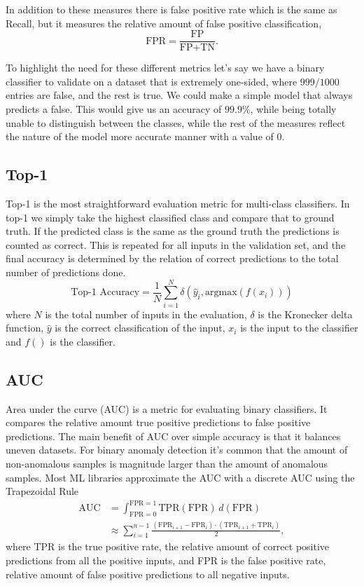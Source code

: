 \documentclass[12pt,a4paper,english
]{tunithesis}
\begin{document}
In addition to these measures there is false positive rate which is the same as Recall, but it measures the relative amount of false positive classification,
\begin{equation}
\text{FPR} = \frac{\text{FP}}{\text{FP} + \text{TN}}.
\end{equation}

To highlight the need for these different metrics let's say we have a binary classifier to validate on a dataset that is extremely one-sided, where $999/1000$ entries are false, and the rest is true. We could make a simple model that always predicts a false. This would give us an accuracy of $99.9\%$, while being totally unable to distinguish between the classes, while the rest of the measures reflect the nature of the model more accurate manner with a value of $0$.~\cite{DeepLearningBook}

\subsection{Top-1}
Top-1 is the most straightforward evaluation metric for multi-class classifiers. In top-1 we simply take the highest classified class and compare that to ground truth. If the predicted class is the same as the ground truth the predictions is counted as correct. This is repeated for all inputs in the validation set, and the final accuracy is determined by the relation of correct predictions to the total number of predictions done.
\begin{equation}
\text{Top-1 Accuracy} = \frac{1}{N} \sum_{i=1}^{N} \delta(\hat{y}_i, \text{argmax}(f(x_i)))
\end{equation}
where $N$ is the total number of inputs in the evaluation, $\delta$ is the Kronecker delta function, $\hat{y}$ is the correct classification of the input, $x_i$ is the input to the classifier and $f()$ is the classifier.

\subsection{AUC}
Area under the curve (AUC) is a metric for evaluating binary classifiers. It compares the relative amount true positive predictions to false positive predictions.
The main benefit of AUC over simple accuracy is that it balances uneven datasets. For binary anomaly detection it's common that the amount of non-anomalous samples is magnitude larger than the amount of anomalous samples.
Most ML libraries approximate the AUC with a discrete AUC using the Trapezoidal Rule~\cite{paszke_pytorch_2019}
\begin{align}
\text{AUC} & = \int_{\text{FPR}=0}^{\text{FPR}=1} \text{TPR}(\text{FPR}) \, d(\text{FPR}) \\
& \approx \sum_{i=1}^{n-1} \frac{(\text{FPR}_{i+1} - \text{FPR}_i) \cdot (\text{TPR}_{i+1} + \text{TPR}_i)}{2},
\end{align}
where TPR is the true positive rate, the relative amount of correct positive predictions from all the positive inputs, and FPR is the false positive rate, relative amount of false positive predictions to all negative inputs.
\end{document}
